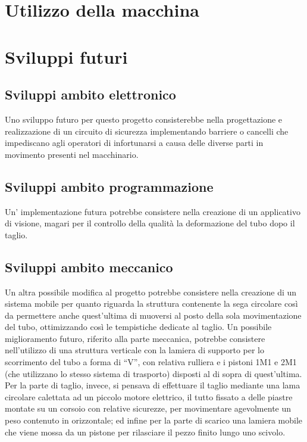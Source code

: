 \documentclass{report}
\begin{document}
\chapter{Utilizzo della macchina}


\chapter{Sviluppi futuri}
\section{Sviluppi ambito elettronico}
  Uno sviluppo futuro per questo progetto consisterebbe nella progettazione e realizzazione di un circuito di sicurezza implementando barriere o cancelli che impediscano agli operatori di infortunarsi a causa delle diverse parti in movimento presenti nel macchinario.

\section{Sviluppi ambito programmazione} 
  Un' implementazione futura potrebbe consistere nella creazione di un applicativo di visione, magari per il controllo della qualità  la deformazione del tubo dopo il taglio.
  
\section{Sviluppi ambito meccanico}  
  Un altra possibile modifica al progetto potrebbe consistere nella creazione di un sistema mobile per quanto riguarda la struttura contenente la sega circolare così da permettere anche quest'ultima di muoversi al posto della sola movimentazione del tubo, ottimizzando così le tempistiche dedicate al taglio.
  Un possibile miglioramento futuro, riferito alla parte meccanica, potrebbe consistere nell’utilizzo di una struttura verticale con la lamiera di supporto per lo scorrimento del tubo a forma di “V”, con relativa rulliera e i pistoni 1M1 e 2M1 (che utilizzano lo stesso sistema di trasporto) disposti al di sopra di quest’ultima. Per la parte di taglio, invece, si pensava di effettuare il taglio mediante una lama circolare calettata ad un piccolo motore elettrico, il tutto fissato a delle piastre montate su un corsoio con relative sicurezze, per movimentare agevolmente un peso contenuto in orizzontale; ed infine per la parte di scarico una lamiera mobile che viene mossa da un pistone per rilasciare il pezzo finito lungo uno scivolo.
\end{document}
